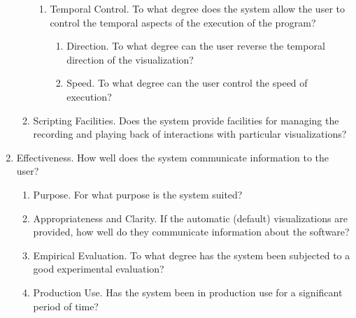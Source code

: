 \begin{enumerate}
\begin{enumerate}
\begin{enumerate}
      \item Temporal Control. To what degree does the system allow the user to
      control the temporal aspects of the execution of the program?
      \begin{enumerate}
        \item Direction. To what degree can the user reverse the temporal
        direction of the visualization?
        \item Speed. To what degree can the user control the speed of execution?
      \end{enumerate}
    \end{enumerate}
    \item Scripting Facilities. Does the system provide facilities for managing
    the recording and playing back of interactions with particular
    visualizations?
  \end{enumerate}
  \item Effectiveness. How well does the system communicate information to the
  user?
  \begin{enumerate}
    \item Purpose. For what purpose is the system suited?
    \item Appropriateness and Clarity. If the automatic (default) visualizations
    are provided, how well do they communicate information about the software?
    \item Empirical Evaluation. To what degree has the system been subjected to
    a good experimental evaluation?
    \item Production Use. Has the system been in production use for a
    significant period of time?
  \end{enumerate}
\end{enumerate}





